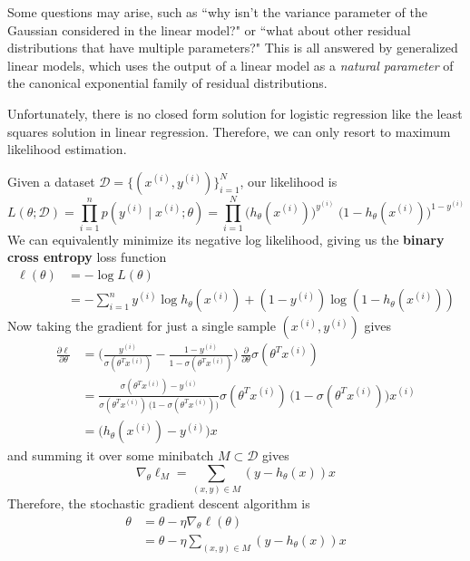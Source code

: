 \documentclass{article}
\begin{document}
  Some questions may arise, such as ``why isn't the variance parameter of the Gaussian considered in the linear model?" or ``what about other residual distributions that have multiple parameters?" This is all answered by generalized linear models, which uses the output of a linear model as a \textit{natural parameter} of the canonical exponential family of residual distributions. 

  Unfortunately, there is no closed form solution for logistic regression like the least squares solution in linear regression. Therefore, we can only resort to maximum likelihood estimation. 

  \begin{theorem}
    Given a dataset $\mathcal{D} = \{(x^{(i)}, y^{(i)})\}_{i=1}^N$, our likelihood is 
    \begin{equation}
      L(\theta ; \mathcal{D}) = \prod_{i=1}^n p(y^{(i)} \;|\; x^{(i)} ; \theta) = \prod_{i=1}^N  \big( h_\theta (x^{(i)} )\big)^{y^{(i)}} \; \big( 1 - h_\theta (x^{(i)})\big)^{1-y^{(i)}}
    \end{equation}
    We can equivalently minimize its negative log likelihood, giving us the \textbf{binary cross entropy} loss function
    \begin{align}
      \ell(\theta) & = -\log L(\theta) \\
      & = -\sum_{i=1}^n y^{(i)} \log h_\theta (x^{(i)}) + (1 - y^{(i)}) \log (1 - h_\theta (x^{(i)}))
    \end{align}
    Now taking the gradient for just a single sample $(x^{(i)}, y^{(i)})$ gives 
    \begin{align}
        \frac{\partial \ell}{\partial \theta}  & = \bigg( \frac{y^{(i)}}{\sigma(\theta^T x^{(i)})} - \frac{1 - y^{(i)}}{1 - \sigma(\theta^T x^{(i)})} \bigg) \, \frac{\partial}{\partial \theta} \sigma (\theta^T x^{(i)}) \\
        & = \frac{\sigma(\theta^T x^{(i)}) - y^{(i)}}{\sigma(\theta^T x^{(i)}) \, \big( 1 - \sigma(\theta^T x^{(i)}) \big)} \sigma(\theta^T x^{(i)}) \, \big( 1 - \sigma(\theta^T x^{(i)}) \big) x^{(i)} \\
        & = \big( h_\theta (x^{(i)}) - y^{(i)} \big) x
    \end{align}
    and summing it over some minibatch $M \subset \mathcal{D}$ gives 
    \begin{equation}
      \nabla_\theta \ell_M = \sum_{(x, y) \in M} (y - h_\theta(x)) x
    \end{equation}
    Therefore, the stochastic gradient descent algorithm is 
    \begin{align}
      \theta & = \theta - \eta \nabla_\theta \ell (\theta) \\
      & = \theta - \eta \sum_{(x, y) \in M} (y - h_\theta(x)) x
    \end{align}
  \end{theorem}
\end{document}
